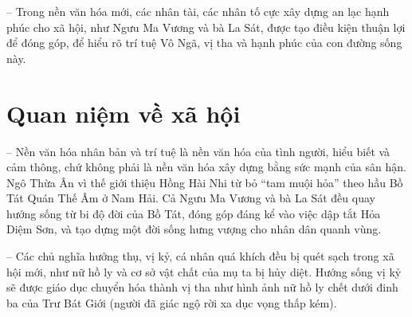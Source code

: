 -- Trong nền văn hóa mới, các nhân tài, các nhân tố cực xây dựng an lạc hạnh phúc cho xã hội, như Ngưu Ma Vương và bà La Sát, được tạo điều kiện thuận lợi để đóng góp, để hiểu rõ trí tuệ Vô Ngã, vị tha và hạnh phúc của con đường sống này.

\section{Quan niệm về xã hội} %
\label{sec:59_60_xa_hoi}

-- Nền văn hóa nhân bản và trí tuệ là nền văn hóa của tình người, hiểu biết và cảm thông, chứ không phải là nền văn hóa xây dựng bằng sức mạnh của sân hận. Ngô Thừa Ân vì thế giới thiệu Hồng Hài Nhi từ bỏ ``tam muội hỏa'' theo hầu Bồ Tát Quán Thế Âm ở Nam Hải. Cả Ngưu Ma Vương và bà La Sát đều quay hướng sống từ bi độ đời của Bồ Tát, đóng góp đáng kể vào việc dập tắt Hỏa Diệm Sơn, và tạo dựng một đời sống hưng vượng cho nhân dân quanh vùng.

-- Các chủ nghĩa hưởng thụ, vị kỷ, cá nhân quá khích đều bị quét sạch trong xã hội mới, như nữ hồ ly và cơ sở vật chất của mụ ta bị hủy diệt. Hướng sống vị kỷ sẽ được giáo dục chuyển hóa thành vị tha như hình ảnh nữ hồ ly chết dưới đinh ba của Trư Bát Giới (người đã giác ngộ rời xa dục vọng thấp kém).
